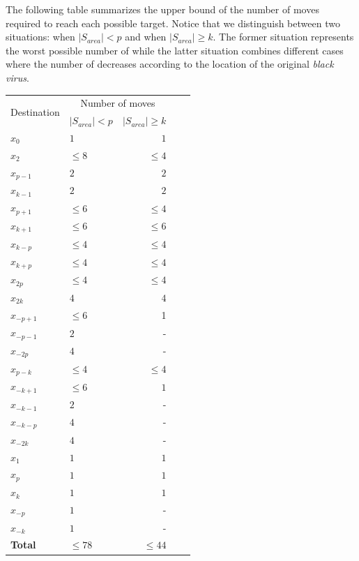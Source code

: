 The following table summarizes the upper bound of  the number of moves required to reach each possible target. Notice that we distinguish between two situations: when $\left\vert{S_{area}}\right\vert < p$ and  when $\left\vert{S_{area}}\right\vert \ge k$. The former situation represents the worst possible number of \bvs while the latter situation combines different cases where the number of \bvs decreases according to the location of the original {\it black virus}.
\begin{center}
\begin{tabular}{|l|lr|lr|}\hline
\multirow{2}{1 in}{Destination} &
\multicolumn{2}{c|}{Number of moves}
\\
& $\left\vert{S_{area}}\right\vert < p$ & $\left\vert{S_{area}}\right\vert \ge k$ \\\hline\hline
$x_0$       & $1$ & $1$  \\\hline
$x_2$       & $\leq8$ & $\leq 4$  \\\hline
$x_{p-1}$    & $2$   & $2$     \\\hline
$x_{k-1}$    & $2$   & $2$     \\\hline
$x_{p+1}$ & $\leq 6$   & $\leq 4$         \\\hline
$x_{k+1}$ & $\leq 6$   & $\leq 6$         \\\hline
$x_{k-p}$ & $\leq 4$   & $\leq 4$         \\\hline
$x_{k+p}$ & $\leq 4$   & $\leq 4$         \\\hline
$x_{2p}$            & $\leq 4$   & $\leq 4$        \\\hline
$x_{2k}$            & $ 4$   & $ 4$        \\\hline
$x_{-p+1}$    & $\leq 6$   & 1    \\\hline
$x_{-p-1}$    & $2$   & -     \\\hline
$x_{-2p}$ & $4$   & -        \\\hline
$x_{p-k}$            & $\leq 4$   & $\leq 4$        \\\hline
$x_{-k+1}$            & $\leq 6$   & $1$        \\\hline
$x_{-k-1}$    & $2$   & -     \\\hline
$x_{-k-p}$            & $4$   & -        \\\hline
$x_{-2k}$ & $4$   & -        \\\hline

$x_1$       & $1$ & $1$  \\\hline
$x_p$       & $1$ & $1$  \\\hline
$x_k$       & $1$ & $1$  \\\hline
$x_{-p}$       & $1$ & -  \\\hline
$x_{-k}$       & $1$ & -  \\\hline
{\bf Total}     & $\leq 78$   & $\leq 44$ \\\hline
\end{tabular}
\end{center}





